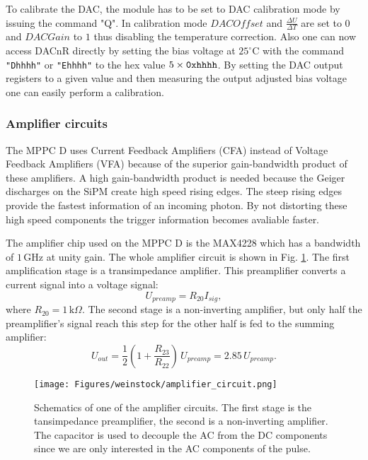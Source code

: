 \documentclass[]{article}
\begin{document}
To calibrate the DAC, the module has to be set to DAC calibration mode by issuing the command "Q". In calibration mode $DACOffset$ and $\frac{\Delta U}{\Delta T}$ 
are set to $0$ and $DACGain$ to $1$ thus disabling the temperature correction. Also one can now access DACnR directly by setting the bias voltage 
at $25^{\circ} \text{C}$ with the command \verb|"Dhhhh"| or \verb|"Ehhhh"| to the hex value $5\times\verb|0xhhhh|$. By setting the DAC output registers to a given value and then measuring the 
output adjusted bias voltage one can easily perform a calibration.

\subsubsection{Amplifier circuits}

The MPPC D uses Current Feedback Amplifiers (CFA) instead of Voltage Feedback Amplifiers (VFA) because of the superior gain-bandwidth product of these amplifiers. A high 
gain-bandwidth product is needed because the Geiger discharges on the SiPM create high speed rising edges. The steep rising edges provide the fastest information of an incoming photon. 
By not distorting these high speed components the trigger information becomes avaliable faster.

The amplifier chip used on the MPPC D is the MAX4228 which has a bandwidth of $1\,\text{GHz}$ at unity gain. The whole amplifier circuit is shown in Fig. \ref{fig:amp_cir}. 
The first amplification stage is a transimpedance amplifier. This preamplifier converts a current signal into a voltage signal:
\begin{equation}
	U_{preamp} = R_{20} I_{sig},
\end{equation}
where $R_{20} = 1\,\text{k}\Omega$. The second stage is a non-inverting amplifier, but only half the preamplifier's signal reach this step for the other half is fed to the summing amplifier:
\begin{equation}
	U_{out} = \frac{1}{2} (1 + \frac{R_{23}}{R_{22}}) \, U_{preamp} = 2.85 \, U_{preamp}.
\end{equation}

	\begin{figure}[t]
		\centering
			\texttt{[image: Figures/weinstock/amplifier\_circuit.png]}
		\caption{Schematics of one of the amplifier circuits. The first stage is the tansimpedance preamplifier, the second is a non-inverting amplifier. The capacitor is used to decouple the AC from the DC components since we are only interested in the AC components of the pulse.}
		\label{fig:amp_cir}
	\end{figure}	
	
\end{document}
